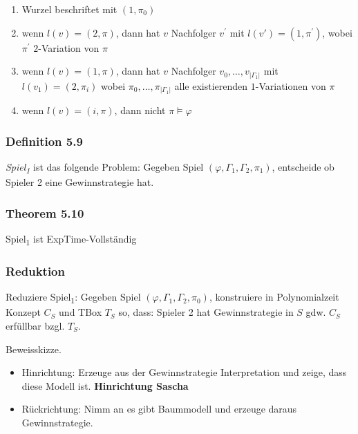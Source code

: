 \begin{enumerate}
\def\labelenumi{\alph{enumi})}
\item
  Wurzel beschriftet mit $\left( 1,\pi_{0} \right)$
\item
  wenn $l\left( v \right) = (2,\pi)$, dann hat $v$ Nachfolger
  $v^{'}$ mit $l\left( v' \right) = \left( 1,\pi^{'} \right)$, wobei
  $\pi^{'}$ $2$-Variation von $\pi$
\item
  wenn $l\left( v \right) = (1,\pi)$, dann hat $v$ Nachfolger
  $v_{0},\ldots,v_{\left| \Gamma_{1} \right|}$ mit
  $l\left( v_{1} \right) = (2,\pi_{i})$ wobei
  $\pi_{0},\ldots,\pi_{\left| \Gamma_{1} \right|}$ alle existierenden
  $1$-Variationen von $\pi$
\item
  wenn $l\left( v \right) = (i,\pi)$, dann nicht
  $\pi \vDash \varphi$
\end{enumerate}

\subsubsection{Definition 5.9}\label{definition-5.9}

\emph{Spiel\textsubscript{1}} ist das folgende Problem: Gegeben Spiel
$\left( \varphi,\Gamma_{1},\Gamma_{2},\pi_{1} \right)$, entscheide ob
Spieler 2 eine Gewinnstrategie hat.

\subsubsection{Theorem 5.10}\label{theorem-5.10}

Spiel\textsubscript{1} ist ExpTime-Vollständig

\subsubsection{Reduktion}\label{reduktion}

Reduziere Spiel\textsubscript{1}: Gegeben Spiel
$\left( \varphi,\Gamma_{1},\Gamma_{2},\pi_{0} \right)$, konstruiere in
Polynomialzeit Konzept $C_{S}$ und TBox $T_{S}$ so, dass: Spieler 2
hat Gewinnstrategie in $S$ gdw. $C_{S}$ erfüllbar bzgl. $T_{S}$.

Beweisskizze.

\begin{itemize}
\item
  Hinrichtung: Erzeuge aus der Gewinnstrategie Interpretation und zeige,
  dass diese Modell ist. \textbf{Hinrichtung Sascha}
\item
  Rückrichtung: Nimm an es gibt Baummodell und erzeuge daraus
  Gewinnstrategie.
\end{itemize}

